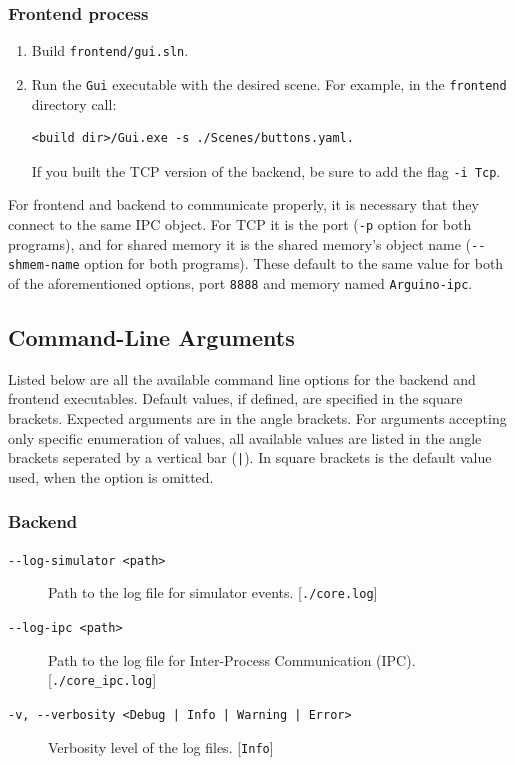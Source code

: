 \subsubsection{Frontend process}
\begin{enumerate}
    \item Build \texttt{frontend/gui.sln}.
    \item Run the \texttt{Gui} executable with the desired scene. For example, in the \texttt{frontend} directory call:
    
    \begin{lstlisting}[language=shell]
    <build dir>/Gui.exe -s ./Scenes/buttons.yaml.
    \end{lstlisting}
    
    If you built the TCP version of the backend, be sure to add the flag \texttt{-i Tcp}.
    
\end{enumerate}

For frontend and backend to communicate properly, it is necessary that they connect to the same IPC object. For TCP it is the port (\texttt{-p} option for both programs), and for shared memory it is the shared memory's object name (\texttt{-{}-shmem-name} option for both programs). These default to the same value for both of the aforementioned options, port \texttt{8888} and memory named \texttt{Arguino-ipc}.

\subsection{Command-Line Arguments}
Listed below are all the available command line options for the backend and frontend executables. Default values, if defined, are specified in the square brackets. Expected arguments are in the angle brackets. For arguments accepting only specific enumeration of values, all available values are listed in the angle brackets seperated by a vertical bar (\texttt{|}). In square brackets is the default value used, when the option is omitted.


\subsubsection{Backend}
\begin{description}
    \item[\texttt{-{}-log-simulator <path>}] Path to the log file for simulator events. [\texttt{./core.log}]
    \item[\texttt{-{}-log-ipc <path>}] Path to the log file for Inter-Process Communication (IPC). [\texttt{./core\_ipc.log}]
    \item[\texttt{-v, -{}-verbosity <Debug | Info | Warning | Error>}] Verbosity level of the log files. [\texttt{Info}]
\end{description}

